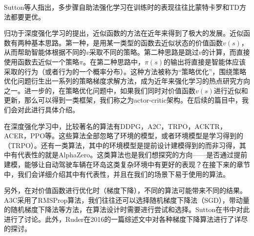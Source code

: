 \documentclass[degree=bachelor, tocarialchapter, pifootnote]{thuthesis}
\begin{document}
      \par Sutton等人指出，多步骤自助法强化学习在训练时的表现往往比蒙特卡罗和TD方法都要更优\cite{Sutton_book}。
      \par 归功于深度强化学习的提出\cite{atari_2013}\cite{deepRL_overview}，近似函数的方法在近年来得到了极大的发展。近似函数有两种基本思路。第一种，是用某一类型的函数去近似状态的价值函数$v(s)$，从而帮助智能体根据不同的$v$采取不同的策略。第二种思路是跳过$v$的计算，而直接使用函数去近似一个策略$\pi$。在第二种思路中，$\pi(s)$的输出将直接是智能体应该采取的行为（或者行为的一个概率分布）。这种方法被称为``策略优化''，围绕策略优化问题衍生出一系列的策略梯度求解方法，成为近年来强化学习的热点研究方向之一。进一步的，在策略优化问题中，如果我们同时对价值函数$v(s)$进行近似和更新，那么可以得到一类框架，我们称之为actor-critic架构\cite{Sutton_book}。在后续的篇目中，我们会对此进行具体介绍。\par
      在深度强化学习中，比较著名的算法有DDPG\cite{DDPG}，A2C\cite{A3C}，TRPO\cite{TRPO}，ACKTR\cite{ACKTR}，ACER\cite{ACER}，PPO\cite{PPO}等。这些算法全部忽略了环境的模型，或者环境模型是学习得到的（TRPO）。还有一类算法，其中的环境模型是提前设计建模得到的而非习得，其中有代表性的就是AlphaZero\cite{AlphaZero}。这类算法也是我们想探究的方向——是否通过提前建模，能够让自动驾驶车辆在环岛这类复杂环境中有更好的表现？在接下来的章节中，我们会详细介绍其中有代表性，并且在我们的场景下易于使用的算法。\par
      另外，在对价值函数进行优化时（梯度下降），不同的算法可能带来不同的结果。A3C采用了RMSProp算法\cite{RMSProp}，我们往往还可以选择随机梯度下降法（SGD），带动量的随机梯度下降法\cite{SGD_momentum}等方法，在算法设计时需要进行尝试和选择。Sutton在书中对此进行了讨论\cite{Sutton_book}。此外，Ruder在2016的一篇综述文中对各种梯度下降算法进行了详尽的探讨\cite{GD_overview}。

      
\end{document}

